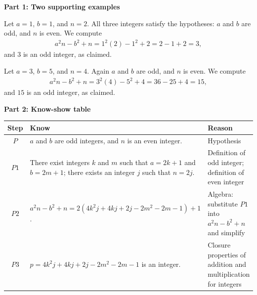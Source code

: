 \documentclass[10pt]{exam}
\begin{document}
\begin{questions}

\begin{solution}
\textbf{Part 1: Two supporting examples}

Let $a = 1$, $b = 1$, and $n = 2$. All three integers satisfy the hypotheses: $a$ and $b$ are odd, and $n$ is even. We compute
\begin{align*}
a^2n - b^2 + n = 1^2(2) - 1^2 + 2 = 2 - 1 + 2 = 3,
\end{align*}
and $3$ is an odd integer, as claimed.

Let $a = 3$, $b = 5$, and $n = 4$. Again $a$ and $b$ are odd, and $n$ is even. We compute
\begin{align*}
a^2n - b^2 + n = 3^2(4) - 5^2 + 4 = 36 - 25 + 4 = 15,
\end{align*}
and $15$ is an odd integer, as claimed.

\textbf{Part 2: Know-show table}

\begin{center}
\begin{tabular}{|c|p{7cm}|p{5cm}|}
\hline
Step & Know & Reason \\ \hline
$P$ & $a$ and $b$ are odd integers, and $n$ is an even integer. & Hypothesis \\ \hline
$P1$ & There exist integers $k$ and $m$ such that $a = 2k+1$ and $b = 2m+1$; there exists an integer $j$ such that $n = 2j$. & Definition of odd integer; definition of even integer \\ \hline
$P2$ & $a^2n - b^2 + n = 2(4k^2j + 4kj + 2j - 2m^2 - 2m - 1) + 1$. & Algebra: substitute $P1$ into $a^2n-b^2+n$ and simplify \\ \hline
$P3$ & $p = 4k^2j + 4kj + 2j - 2m^2 - 2m - 1$ is an integer. & Closure properties of addition and multiplication for integers \\ \hline
\end{tabular}
\end{center}
 

\end{solution}
\end{questions}
\end{document}
